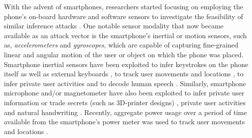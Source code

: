 \documentclass[]{IEEEtran}
\begin{document}
With the advent of smartphones, researchers started focusing on employing the phone's on-board hardware and software sensors to investigate the feasibility of similar inference attacks \cite{uluagac2014sensory}. One notable sensor modality that now became available as an attack vector is the smartphone's inertial or motion sensors, such as, \emph{accelerometers} and \emph{gyroscopes}, which are capable of capturing fine-grained linear and angular motion of the user or object on which the phone was placed. Smartphone inertial sensors have been exploited to infer keystrokes on the phone itself as well as external keyboards \cite{barisani2009sniffing,marquardt2011sp,CaiC:2011,xu2012taplogger,OwusuHDPZ:2012}, to track user movements and locations \cite{han2012accomplice,ho2015pressure,narain2016inferring}, to infer private user activities \cite{ortizL:2015} and to decode human speech \cite{michalevsky2014gyrophone}. Similarly, smartphone microphone and/or magnetometer have also been exploited to infer private user information \cite{schlegel2011soundcomber} or trade secrets (such as 3D-printer designs) \cite{hojjati2016leave,song2016my,faruque2016acoustic}, private user activities \cite{rossi2013ambientsense} and natural handwriting \cite{Yu:2016:WAB}. Recently, aggregate power usage over a period of time available from the smartphone's power meter was used to track user movements and locations \cite{michalevsky2015powerspy}. 
\end{document}
